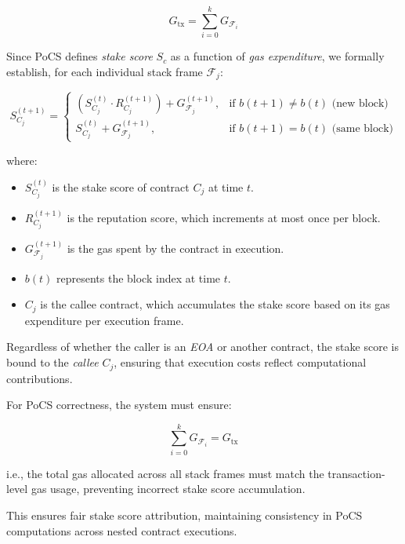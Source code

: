 \documentclass{article}
\begin{document}
\begin{equation}
G_{\text{tx}} = \sum_{i=0}^{k} G_{\mathcal{F}_i}
\end{equation}

Since PoCS defines \textit{stake score} \( S_c \) as a function of \textit{gas expenditure}, we formally establish, for each individual stack frame $\mathcal{F}_j$:

\begin{equation}
S_{C_j}^{(t+1)} =
\begin{cases} 
(S_{C_j}^{(t)} \cdot R_{C_j}^{(t+1)}) + G_{\mathcal{F}_j}^{(t+1)}, & \text{if } b(t+1) \neq b(t) \text{ (new block)} \\
S_{C_j}^{(t)} + G_{\mathcal{F}_j}^{(t+1)}, & \text{if } b(t+1) = b(t) \text{ (same block)}
\end{cases}
\end{equation}

where:
\begin{itemize}
    \item \( S_{C_j}^{(t)} \) is the stake score of contract \( C_j \) at time \( t \).
    \item \( R_{C_j}^{(t+1)} \) is the reputation score, which increments at most once per block.
    \item \( G_{\mathcal{F}_j}^{(t+1)} \) is the gas spent by the contract in execution.
    \item \( b(t) \) represents the block index at time \( t \).
    \item \( C_j \) is the callee contract, which accumulates the stake score based on its gas expenditure per execution frame.
\end{itemize}

Regardless of whether the caller is an \textit{EOA} or another contract, the stake score is bound to the \textit{callee} \( C_j \), ensuring that execution costs reflect computational contributions.

For PoCS correctness, the system must ensure:

\begin{equation}
\sum_{i=0}^{k} G_{\mathcal{F}_i} = G_{\text{tx}}
\end{equation}

i.e., the total gas allocated across all stack frames must match the transaction-level gas usage, preventing incorrect stake score accumulation.

This ensures fair stake score attribution, maintaining consistency in PoCS computations across nested contract executions.
\end{document}
